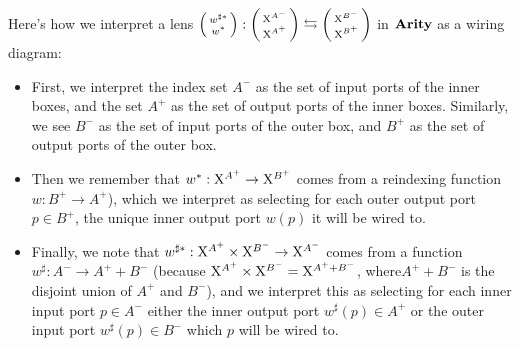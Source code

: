 \documentclass[DynamicalBook]{subfiles}
\begin{document}
Here's how we interpret a lens
$\lens{w^{\sharp\ast}}{w^{\ast}} : \lens{\XX^{A^{-}}}{\XX^{A^+}}
\leftrightarrows \lens{\XX^{B^{-}}}{\XX^{B^+}}$ in $\textbf{Arity}$ as a
wiring diagram:
\begin{itemize}
  \item First, we interpret the index set $A^-$ as the set of input ports of the
    inner boxes, and the set $A^+$ as the set of output ports of the inner
    boxes. Similarly, we see $B^-$ as the set of input ports of the outer box,
    and $B^+$ as the set of output ports of the outer box.
  \item Then we remember that $w^{\ast} :
    \mathrm{X}^{A^+} \to \mathrm{X}^{B^+}$ comes from a reindexing function $w : B^+ \to
    A^+$), which we interpret
    as selecting for each outer output port $p \in B^+$, the unique inner output
    port $w(p)$ it will be wired to.
  \item Finally, we note that $w^{\sharp\ast} : \mathrm{X}^{A^+} \times \mathrm{X}^{B^-} \to
    \mathrm{X}^{A^-}$ comes from a function $w^{\sharp} : A^- \to A^+ + B^-$ (because
    $\mathrm{X}^{A^+} \times \mathrm{X}^{B^-} = \mathrm{X}^{A^+ + B^-}$, where$A^{+} + B^{-}$ is the disjoint union of $A^{+}$ and $B^{-}$), and we interpret this as
    selecting for each inner input port $p \in A^-$ either the inner output port
    $w^{\sharp}(p) \in A^+$ or the outer input port
    $w^{\sharp}(p) \in B^-$ which $p$ will be wired to.
\end{itemize}
\end{document}
